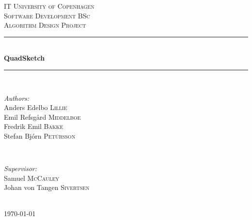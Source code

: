 \documentclass{article}
\begin{document}
%
\begin{titlepage}
	
	\newcommand{\HRule}{\rule{\linewidth}{0.5mm}} %
	
	\center %
	
	\textsc{\LARGE IT University of Copenhagen}\\[1.5cm] %
	\textsc{\Large Software Development BSc}\\[0.5cm] %
	\textsc{\large Algorithm Design Project}\\[0.5cm] %
	
	\HRule \\[0.4cm]
	{ \huge \bfseries QuadSketch}\\[0.4cm] %
	\HRule \\[1.5cm]
	
	\begin{minipage}{0.4\textwidth}
		\begin{flushleft} \large
			\emph{Authors:}\\
			Anders Edelbo \textsc{Lillie} \\
			Emil Refsgård \textsc{Middelboe} \\
			Fredrik Emil \textsc{Bakke} \\
			Stefan Bjórn \textsc{Petúrsson}
		\end{flushleft}
	\end{minipage}
	~
	\begin{minipage}{0.4\textwidth}
		\begin{flushright} \large
			\emph{Supervisor:} \\
			Samuel \textsc{McCauley} \\
			Johan von Tangen \textsc{Sivertsen}
		\end{flushright}
	\end{minipage}\\[4cm]
	
	{\large \today}\\[3cm] 
	
	\vfill %
	
\end{titlepage}

\begin{abstract}
\end{abstract}
\clearpage

\tableofcontents
\clearpage
{} %
	

%
%


%
% 


%
	
\end{document}
